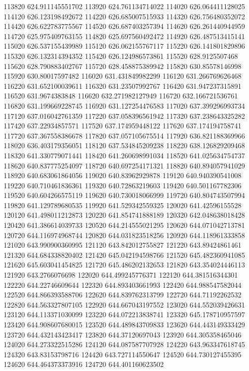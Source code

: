 {113820 624.911145551702
113920 624.761134714022
114020 626.064411128025
114120 626.123198492672
114220 626.685007515933
114320 626.756480352072
114420 626.622783775567
114520 626.687403257394
114620 626.261440944959
114720 625.975409763155
114820 625.697560492472
114920 626.487513415141
115020 626.537155439989
115120 626.062155767117
115220 626.141801829896
115320 626.132314394352
115420 626.124986573861
115520 628.9125507468
115620 628.790883402767
115720 628.458875389942
115820 630.85578146998
115920 630.80017597482
116020 631.431849982299
116120 631.266769626468
116220 631.652100039611
116320 631.23507992767
116420 631.947237315891
116520 631.9674383848
116620 632.271982127949
116720 632.166721536761
116820 631.199669228745
116920 631.127254476583
117020 637.399296993734
117120 637.016042761359
117220 637.058396561942
117320 637.238643325282
117420 637.22934857571
117520 637.174959448122
117620 637.174194758741
117720 637.367558386678
117820 637.057105675514
117920 636.821188369966
118020 636.403179356051
118120 637.534845209238
118220 638.126829209468
118320 641.330779071441
118420 641.260698991034
118520 641.025634754737
118620 640.837775254097
118720 640.697254171321
118820 640.894057941029
118920 640.683061864056
119020 640.83962929878
119120 640.940390541008
119220 640.710461836361
119320 640.72863219603
119420 640.501167782306
119520 640.604266575119
119620 640.730018066999
119720 640.804743507994
119820 641.129789680535
119920 641.529342559325
120020 641.42596155528
120120 641.498011212873
120220 641.854741888189
120320 642.048638018428
120420 641.386614039733
120520 644.214555021295
120620 644.071042713781
120720 644.116974968744
120820 644.031823518256
120920 644.118961333858
121020 643.990900360995
121120 643.842012755827
121220 643.89424861461
121320 644.684338820402
121420 645.042194598766
121520 645.482360941085
121620 645.603041454825
121720 645.486202132653
121820 643.354024446113
121920 643.2766076698
122020 644.499245776371
122120 644.381516344301
122220 644.22746609644
122320 644.893403661993
122420 644.988547582044
122520 644.866393588706
122620 644.839762313799
122720 644.71192262532
122820 644.563327807105
122920 644.667043197552
123020 644.552039426631
123120 644.113371030099
123220 644.072213838741
123320 645.178710957597
123420 644.908607680015
123520 644.489843709833
123620 644.443149333429
123720 644.432143423417
123820 644.37120697043
123920 644.305358465046
124020 644.273322515286
124120 644.087587707928
124220 643.963347618745
124320 643.83153798716
124420 643.727114550647
124520 644.730127455395
124620 644.464373373916
124720 644.401160623502
}
